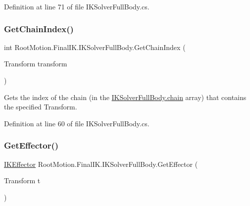 Definition at line 71 of file I\+K\+Solver\+Full\+Body.\+cs.

\mbox{\label{class_root_motion_1_1_final_i_k_1_1_i_k_solver_full_body_afa18af05d42150df4de773d6cd85b027}} 
\subsubsection{\texorpdfstring{Get\+Chain\+Index()}{GetChainIndex()}}
{\footnotesize\ttfamily int Root\+Motion.\+Final\+I\+K.\+I\+K\+Solver\+Full\+Body.\+Get\+Chain\+Index (\begin{DoxyParamCaption}\item[{Transform}]{transform }\end{DoxyParamCaption})}



Gets the index of the chain (in the \mbox{\hyperlink{class_root_motion_1_1_final_i_k_1_1_i_k_solver_full_body_aae6ec635c069329275bd5e3eb18dac41}{I\+K\+Solver\+Full\+Body.\+chain}} array) that contains the specified Transform. 



Definition at line 60 of file I\+K\+Solver\+Full\+Body.\+cs.

\mbox{\label{class_root_motion_1_1_final_i_k_1_1_i_k_solver_full_body_a01f3b5d21d61ed9ef995a699801df3ca}} 
\subsubsection{\texorpdfstring{Get\+Effector()}{GetEffector()}}
{\footnotesize\ttfamily \mbox{\hyperlink{class_root_motion_1_1_final_i_k_1_1_i_k_effector}{I\+K\+Effector}} Root\+Motion.\+Final\+I\+K.\+I\+K\+Solver\+Full\+Body.\+Get\+Effector (\begin{DoxyParamCaption}\item[{Transform}]{t }\end{DoxyParamCaption})}




